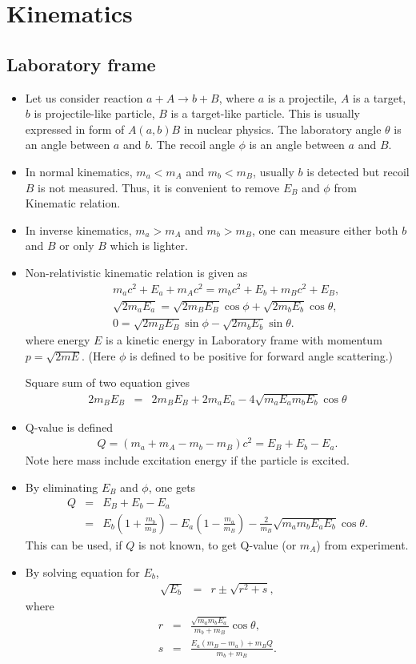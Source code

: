 \documentclass[10pt]{book}
\newcommand{\bea}{\begin{eqnarray}}
\newcommand{\eea}{\end{eqnarray}}
\newcommand{\no}{\nonumber \\}
\begin{document}
\chapter{Kinematics}
\section{Laboratory frame}

\begin{itemize}
	\item Let us consider reaction $a+A\to b+B$, where 
	$a$ is a projectile, $A$ is a target, $b$ is projectile-like particle,
	$B$ is a target-like particle. 
	This is usually expressed in form of $A(a,b)B$ in nuclear physics.
	The laboratory angle $\theta$ is an angle between $a$ and $b$. 
	The recoil angle $\phi$ is an angle between $a$ and $B$. 	
	\item  In normal kinematics, $m_a< m_A$ and $m_b< m_B$, 
	usually $b$ is detected but recoil $B$ is not measured. Thus, it is convenient
	to remove $E_B$ and $\phi$ from Kinematic relation. 
	\item In inverse kinematics, $m_a > m_A$ and $m_b > m_B$,
	one can measure either both $b$ and $B$ or only $B$ which is lighter. 
	\item Non-relativistic kinematic relation is given as
	\bea 
	& & m_a c^2 +E_a+m_A c^2 = m_b c^2 +E_b +m_B c^2 +E_B,\no 
	& & \sqrt{2 m_a E_a} =\sqrt{2m_B E_B}\cos\phi+\sqrt{2m_b E_b}\cos\theta,\no 
	& & 0 = \sqrt{2m_B E_B}\sin\phi -\sqrt{2m_b E_b}\sin\theta . 
	\eea 
	where energy $E$ is a kinetic energy in Laboratory frame with 
	momentum $p=\sqrt{2m E}$.
	(Here $\phi$ is defined to be positive for forward angle scattering.)
	
	Square sum of two equation gives 
	\bea 
	2m_B E_B &=& 2m_B E_B+2m_a E_a-4\sqrt{m_a E_a m_b E_b}\cos\theta 
	\eea 
	\item Q-value is defined
	\bea 
	Q= (m_a+m_A-m_b-m_B)c^2 = E_B+E_b-E_a.
	\eea 
	Note here mass include excitation energy if the particle is excited. 
	\item By eliminating $E_B$ and $\phi$, one gets 
	\bea 
	Q&=& E_B+E_b-E_a \no 
	 &=& E_b\left(1+\frac{m_b}{m_B}\right) -E_a\left(1-\frac{m_a}{m_B}\right) 
	   -\frac{2}{m_B}\sqrt{m_a m_b E_a E_b}\cos\theta. 
	\eea 
	This can be used, if $Q$ is not known, to get Q-value (or $m_A$) from experiment. 
	
	\item By solving equation for $E_b$,
	\bea 
	\sqrt{E_b} &=& r\pm \sqrt{r^2+s},
	\eea 
	where
	\bea 
	r &=& \frac{\sqrt{m_a m_b E_a}}{m_b+m_B}\cos\theta,\no 
	s &=& \frac{E_a(m_B-m_a)+m_B Q}{m_b+m_B}.  
	\eea 
	

\end{itemize}
\end{document}
